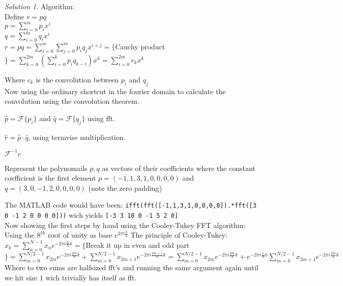 \documentclass[a4paper,twoside=false,abstract=false,numbers=noenddot,
titlepage=false,headings=small,parskip=half,version=last]{scrartcl}
\theoremstyle{definition}
\theoremstyle{remark}
\newtheorem*{solution}{Solution}
\newcommand{\Fourier}{\ensuremath{\mathcal{F}}}
\begin{document}
\begin{solution}

Algorithm:\\

Define $r = pq$\\
$p=\displaystyle\sum_{i=0}^m{p_i x^i}$\\
$q=\displaystyle\sum_{i=0}^m{q_i x^i}$\\
    $r = pq = \displaystyle\sum_{i=0}^m{\displaystyle\sum_{j=0}^m{ p_i q_j x^{i+j} }} = 
    \{$Cauchy product$\} = 
    \displaystyle\sum_{k=0}^{2m}{ 
        \left( \displaystyle\sum_{i=0}^{k}{p_i q_{k-i}} \right) x^k  
    }=
    \displaystyle\sum_{i=0}^{2m}{ 
        r_k x^k  
    } $    

Where ${c_k}$ is the convolution between ${p_i}$ and ${q_j}$\\
Now using the ordinary shortcut in the fourier domain to calculate the convolution using the convolution theorem.\\

\begin{list}{*}{}
    \item $\hat{p}=\Fourier\{p_i\} $ and $\hat{q}=\Fourier\{q_j\}$ using fft.
    \item $\hat{r}=\hat{p} \cdot \hat{q}$, using termvise multiplication. 
    \item $\Fourier^{-1}{\hat{c}}$
\end{list}

Represent the polynomails $p,q$ as vectors of their coefficients where the constant coefficient is the first element
$p=(-1,1,3,1,0,0,0,0)$ and $q=(3,0,-1,2,0,0,0,0)$  (note the zero padding)

The MATLAB code would have been: \verb+ifft(fft([-1,1,3,1,0,0,0,0]).*fft([3 0 -1 2 0 0 0 0]))+ wich yields \verb+[-3 3 10 0 -1 5 2 0]+ \\

Now showing the first steps by hand using the Cooley-Tukey FFT algorithm:\\
Using the $8^{th}$ root of unity as base $e^{2\pi i \frac{k}{8}}$
The principle of Cooley-Tukey:\\

$\hat{x}_k = \displaystyle\sum_{n=0}^{N-1}{x_n e^{-2\pi i \frac{ n}{N} k}} = \{ $Break it up in even and odd part$\}= 
\displaystyle\sum_{m=0}^{N/2-1}{x_{2m} e^{-2\pi i \frac{ 2m}{N} k}}+
\displaystyle\sum_{m=0}^{N/2-1}{x_{2m+1} e^{-2\pi i \frac{ 2m+1}{N} k}}  
=
\displaystyle\sum_{m=0}^{N/2-1}{x_{2m} e^{-2\pi i \frac{ 2m}{N} k}}+
e^{-2\pi i \frac{1}{N} k}\displaystyle\sum_{m=0}^{N/2-1}{x_{2m+1} e^{-2\pi i \frac{ 2m}{N} k}}  
$
Where to two sums are halfsized fft's and running the same argument again until we hit size $1$ wich trivially has itself as fft.\\


\end{solution}
\end{document}
